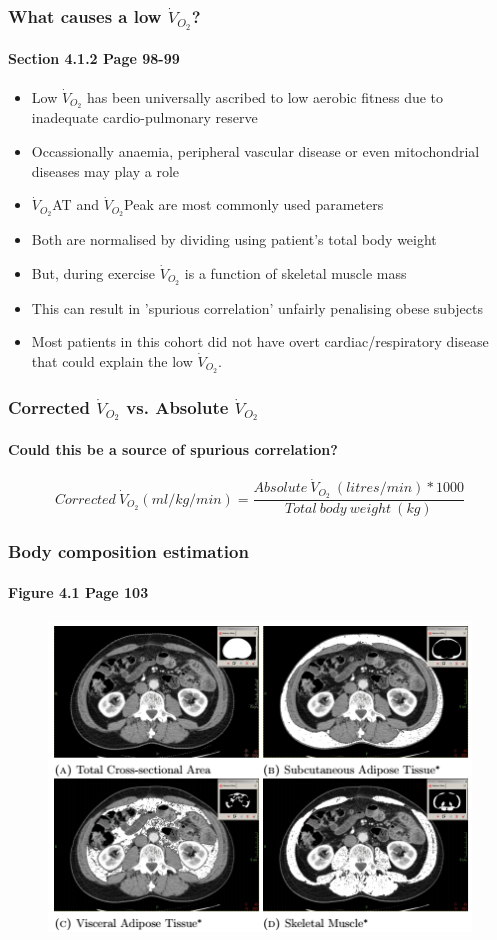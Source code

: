 \documentclass{beamer}
\begin{document}
\begin{frame}
	\frametitle{What causes a low $\dot{V}_{O_2}$? }
	\framesubtitle{Section 4.1.2 Page 98-99 }
	\begin{itemize}
		\item Low $\dot{V}_{O_2}$ has been universally ascribed to low aerobic fitness due to inadequate cardio-pulmonary reserve
		\item Occassionally anaemia, peripheral vascular disease or even mitochondrial diseases may play a role
		\item $\dot{V}_{O_2}$AT and $\dot{V}_{O_2}$Peak are most commonly used parameters
		\item Both are normalised by dividing using patient's total body weight
		\item But, during exercise $\dot{V}_{O_2}$ is a function of skeletal muscle mass
		\item This can result in 'spurious correlation' unfairly penalising obese subjects
		\item Most patients in this cohort did not have overt cardiac/respiratory disease that could explain the low $\dot{V}_{O_2}$.
	\end{itemize}
\end{frame}

\begin{frame}
	\frametitle{Corrected $\dot{V}_{O_2}$ vs. Absolute $\dot{V}_{O_2}$}
	\framesubtitle{Could this be a source of spurious correlation?}
\[Corrected\ \dot{V}_{O_2} (ml/kg/min) = \frac{Absolute\ \dot{V}_{O_2}\ (litres/min) * 1000}{Total\ body\ weight\ (kg)}\]
\end{frame}

\begin{frame}
	\frametitle{Body composition estimation}
	\framesubtitle{Figure 4.1 Page 103}
	\begin{figure}
		\centering
		\includegraphics[width=\linewidth]{bc_gimp}
		\label{fig:bc_gimp}
	\end{figure}
\end{frame}
\end{document}
